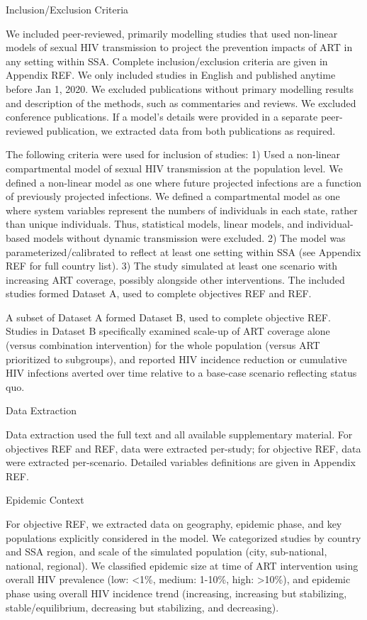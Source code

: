 Inclusion/Exclusion Criteria

We included peer-reviewed, primarily modelling studies that used non-linear models of sexual HIV transmission
to project the prevention impacts of ART in any setting within SSA.
Complete inclusion/exclusion criteria are given in Appendix REF.
We only included studies in English and published anytime before Jan 1, 2020.
We excluded publications without primary modelling results and description of the methods,
such as commentaries and reviews.
We excluded conference publications.
If a model's details were provided in a separate peer-reviewed publication,
we extracted data from both publications as required.

The following criteria were used for inclusion of studies:
1) Used a non-linear compartmental model of
sexual HIV transmission at the population level.
We defined a non-linear model as one where
future projected infections are a function of previously projected infections.
We defined a compartmental model as one where
system variables represent the numbers of individuals in each state,
rather than unique individuals.
Thus, statistical models, linear models, and individual-based models without dynamic transmission were excluded.
2) The model was parameterized/calibrated to reflect at least one setting within SSA
(see Appendix REF for full country list).
3) The study simulated at least one scenario with increasing ART coverage,
possibly alongside other interventions.
The included studies formed Dataset A,
used to complete objectives REF and REF.

A subset of Dataset A formed Dataset B,
used to complete objective REF.
Studies in Dataset B specifically examined
scale-up of ART coverage alone (versus combination intervention)
for the whole population (versus ART prioritized to subgroups),
and reported HIV incidence reduction or cumulative HIV infections averted over time 
relative to a base-case scenario reflecting status quo.

Data Extraction

Data extraction used the full text and all available supplementary material.
For objectives REF and REF, data were extracted per-study;
for objective REF, data were extracted per-scenario.
Detailed variables definitions are given in Appendix REF.

Epidemic Context

For objective REF, we extracted data on
geography, epidemic phase, and key populations explicitly considered in the model.
We categorized studies by country and SSA region, and
scale of the simulated population (city, sub-national, national, regional).
We classified epidemic size at time of ART intervention using
overall HIV prevalence (low: <1\%, medium: 1-10\%, high: >10\%),
and epidemic phase using overall HIV incidence trend
(increasing, increasing but stabilizing, stable/equilibrium, decreasing but stabilizing, and decreasing).

